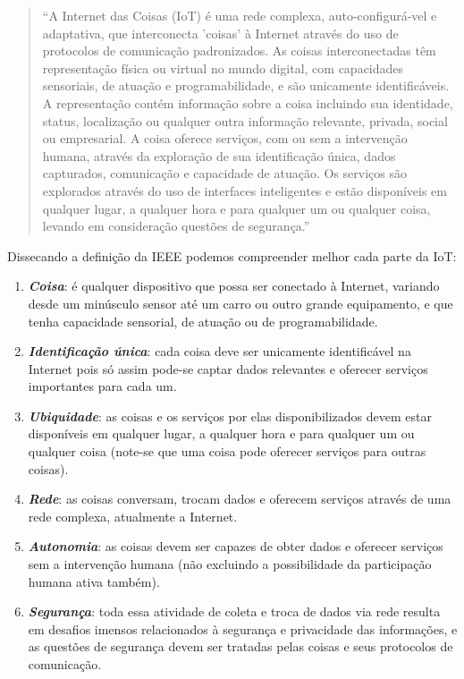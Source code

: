 \documentclass[pdftex, brazil, 12pt, twoside]{article}
\begin{document}
\begin{quote}
  ``A Internet das Coisas (IoT) é uma rede complexa, auto-configurá-vel e adaptativa,
  que interconecta 'coisas' à Internet através do uso de protocolos de comunicação
  padronizados. As coisas interconectadas têm representação física ou virtual no mundo
  digital, com capacidades sensoriais, de atuação e programabilidade, e são unicamente
  identificáveis. A representação contém informação sobre a coisa incluindo sua identidade,
  status, localização ou qualquer outra informação relevante, privada, social ou
  empresarial. A coisa oferece serviços, com ou sem a intervenção humana, através
  da exploração de sua identificação única, dados capturados, comunicação e capacidade
  de atuação. Os serviços são explorados através do uso de interfaces inteligentes e
  estão disponíveis em qualquer lugar, a qualquer hora e para qualquer um ou qualquer
  coisa, levando em consideração questões de segurança.''~\citep{IEEEIoTDefinition}
\end{quote}

Dissecando a definição da IEEE podemos compreender melhor cada parte da IoT:

\begin{enumerate}
\item \emph{\textbf{Coisa}}: é qualquer dispositivo que possa ser conectado
  à Internet, variando desde um minúsculo sensor até um carro ou outro
  grande equipamento, e que tenha capacidade sensorial, de atuação ou de
  programabilidade.
\item \emph{\textbf{Identificação única}}: cada coisa deve ser unicamente
  identificável na Internet pois só assim pode-se captar dados relevantes
  e oferecer serviços importantes para cada um.
\item \emph{\textbf{Ubiquidade}}: as coisas e os serviços por elas disponibilizados
  devem estar disponíveis em qualquer lugar, a qualquer hora e para qualquer um
  ou qualquer coisa (note-se que uma coisa pode oferecer serviços para outras
  coisas).
\item \emph{\textbf{Rede}}: as coisas conversam, trocam dados e oferecem
  serviços através de uma rede complexa, atualmente a Internet.
\item \emph{\textbf{Autonomia}}: as coisas devem ser capazes de
  obter dados e oferecer serviços sem a intervenção humana (não excluindo
  a possibilidade da participação humana ativa também).
\item \emph{\textbf{Segurança}}: toda essa atividade de coleta e troca de
  dados via rede resulta em desafios imensos relacionados à segurança e
  privacidade das informações, e as questões de segurança devem ser
  tratadas pelas coisas e seus protocolos de comunicação.
\end{enumerate}
\end{document}
